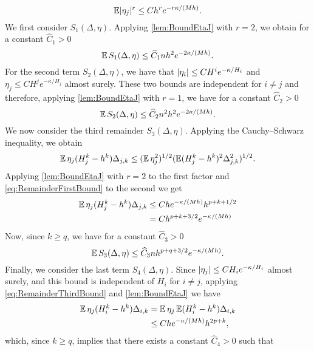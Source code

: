 \documentclass[10pt]{article}
\begin{document}
{\begin{equation}
		\operatorname{\mathbb{E}}\lvert\eta_j\rvert^r \leq Ch^r e^{-r\kappa/(Mh)}.
	\end{equation}
	We first consider $S_1(\Delta, \eta)$. Applying \cref{lem:BoundEtaJ} with $r = 2$, we obtain for a constant $\hat C_1 > 0$ 
	\begin{equation}
		\operatorname{\mathbb{E}} S_1(\Delta, \eta) \leq \widehat C_1 n h^2 e^{-2\kappa/(Mh)}.
	\end{equation}
	For the second term $S_2(\Delta, \eta)$, we have that $\lvert\eta_i\rvert\leq CH^i e^{-\kappa/H_i}$ and $\eta_j\leq CH^j e^{-\kappa/H_j}$ almost surely. These two bounds are independent for $i \neq j$ and therefore, applying \cref{lem:BoundEtaJ} with $r = 1$, we have for a constant $\hat C_2 > 0$
	\begin{equation}
		\operatorname{\mathbb{E}} S_2(\Delta, \eta) \leq \widehat C_2 n^2 h^2 e^{-2\kappa/(Mh)}.
	\end{equation}
	We now consider the third remainder $S_3(\Delta, \eta)$. Applying the Cauchy--Schwarz inequality, we obtain
	\begin{equation}
		\operatorname{\mathbb{E}} \eta_j (H_j^k - h^k) \Delta_{j,k} \leq (\operatorname{\mathbb{E}}\eta_j^2)^{1/2} (\operatorname{\mathbb{E}}(H_j^k - h^k)^2 \Delta_{j,k}^2)^{1/2}.
	\end{equation}
	Applying \cref{lem:BoundEtaJ} with $r = 2$ to the first factor and \eqref{eq:RemainderFirstBound} to the second we get
	\begin{equation}
	\begin{aligned}
		\operatorname{\mathbb{E}} \eta_j (H_j^k - h^k) \Delta_{j,k} &\leq C h e^{-\kappa/(Mh)}h^{p+k+1/2}\\
		&= C h^{p+k+3/2}e^{-\kappa/(Mh)}
	\end{aligned}
	\end{equation}
	Now, since $k \geq q$, we have for a constant $\hat C_3 > 0$
	\begin{equation}
		\operatorname{\mathbb{E}} S_3(\Delta, \eta) \leq \widehat C_3 n h^{p+q+3/2}e^{-\kappa/(Mh)}. 
	\end{equation}
	Finally, we consider the last term $S_4(\Delta, \eta)$. Since $\lvert\eta_j\rvert \leq CH_i e^{-\kappa/H_i}$ almost surely, and this bound is independent of $H_i$ for $i \neq j$, applying \eqref{eq:RemainderThirdBound} and \cref{lem:BoundEtaJ} we have
	\begin{equation}
	\begin{aligned}
		\operatorname{\mathbb{E}}\eta_j(H_i^k - h^k)\Delta_{i,k} &= \operatorname{\mathbb{E}}\eta_j \operatorname{\mathbb{E}} (H_i^k - h^k)\Delta_{i,k}\\
		&\leq Ch e^{-\kappa/(Mh)}h^{2p+k},
	\end{aligned}
	\end{equation}
	which, since $k \geq q$, implies that there exists a constant $\hat C_4 > 0$ such that 
}
\end{document}
